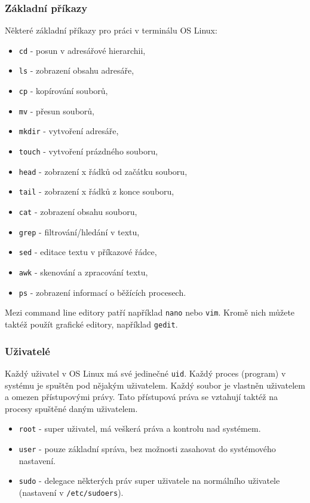\subsubsection{Základní příkazy}
Některé základní příkazy pro práci v terminálu OS Linux:
\begin{itemize}
				\item \texttt{cd} - posun v adresářové hierarchii,
				\item \texttt{ls} - zobrazení obsahu adresáře,
				\item \texttt{cp} - kopírování souborů,
				\item \texttt{mv} - přesun souborů,
				\item \texttt{mkdir} - vytvoření adresáře,
				\item \texttt{touch} - vytvoření prázdného souboru,
				\item \texttt{head} - zobrazení x řádků od začátku souboru,
				\item \texttt{tail} - zobrazení x řádků z konce souboru,
				\item \texttt{cat} - zobrazení obsahu souboru,
				\item \texttt{grep} - filtrování/hledání v textu,
				\item \texttt{sed} - editace textu v příkazové řádce,
				\item \texttt{awk} - skenování a zpracování textu,
				\item \texttt{ps} - zobrazení informací o běžících procesech.
\end{itemize}

Mezi command line editory patří například \texttt{nano} nebo \texttt{vim}. Kromě nich můžete taktéž použít grafické editory, například \texttt{gedit}.

\subsubsection{Uživatelé}
Každý uživatel v OS Linux má své jedinečné \texttt{uid}. Každý proces (program)
v systému je spuštěn pod nějakým uživatelem. Každý soubor je vlastněn uživatelem
a omezen přístupovými právy. Tato přístupová práva se vztahují taktéž na procesy
spuštěné daným uživatelem.

\begin{itemize}
				\item \texttt{root} - super uživatel, má veškerá práva a kontrolu nad systémem.
				\item \texttt{user} - pouze základní správa, bez možnosti zasahovat do systémového nastavení.
				\item \texttt{sudo} - delegace některých práv super uživatele na normálního uživatele (nastavení v \texttt{/etc/sudoers}).
\end{itemize}

